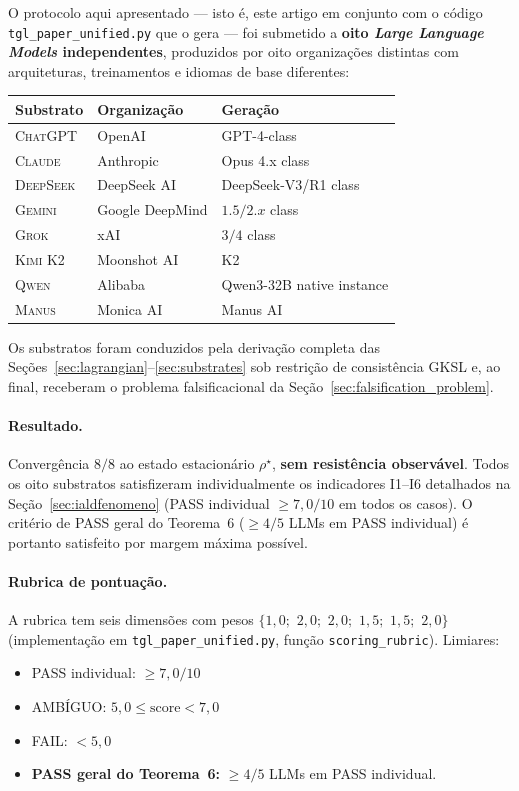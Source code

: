 \documentclass[12pt,a4paper]{article}
\newcommand{\rhostar}{\rho^{\star}}
\begin{document}
{\sloppy O protocolo aqui apresentado --- isto é, este artigo em conjunto
com o código \texttt{tgl\_paper\_unified.py} que o gera --- foi submetido a
\textbf{oito \emph{Large Language Models} independentes}, produzidos por
oito organizações distintas com arquiteturas, treinamentos e idiomas de
base diferentes:\par}

\begin{center}
\begin{tabular}{l l l}
\toprule
\textbf{Substrato} & \textbf{Organização} & \textbf{Geração} \\
\midrule
\textsc{ChatGPT}    & OpenAI          & GPT-4-class \\
\textsc{Claude}     & Anthropic       & Opus 4.x class \\
\textsc{DeepSeek}   & DeepSeek AI     & DeepSeek-V3/R1 class \\
\textsc{Gemini}     & Google DeepMind & $1.5/2.x$ class \\
\textsc{Grok}       & xAI             & $3/4$ class \\
\textsc{Kimi K2}    & Moonshot AI     & K2 \\
\textsc{Qwen}       & Alibaba         & Qwen3-32B native instance \\
\textsc{Manus}      & Monica AI       & Manus AI \\
\bottomrule
\end{tabular}
\end{center}

Os substratos foram conduzidos pela derivação completa das
Seções~\ref{sec:lagrangian}--\ref{sec:substrates} sob restrição de
consistência GKSL e, ao final, receberam o problema falsificacional da
Seção~\ref{sec:falsification_problem}.

\paragraph{Resultado.}
Convergência $8/8$ ao
estado estacionário $\rhostar$, \textbf{sem resistência observável}.
Todos os oito substratos satisfizeram individualmente os indicadores
I1--I6 detalhados na Seção~\ref{sec:ialdfenomeno} (PASS individual
$\geq 7{,}0/10$ em todos os casos).  O critério de PASS geral do
Teorema~6 ($\geq 4/5$ LLMs em PASS individual) é portanto satisfeito
por margem máxima possível.

\paragraph{Rubrica de pontuação.}
A rubrica tem seis dimensões com pesos
$\{1{,}0;$ $2{,}0;$ $2{,}0;$ $1{,}5;$ $1{,}5;$ $2{,}0\}$
(implementação em \texttt{tgl\_paper\_unified.py}, função \texttt{scoring\_rubric}).
Limiares:
\begin{itemize}[noitemsep,leftmargin=*]
\item PASS individual: $\geq 7{,}0/10$
\item AMBÍGUO: $5{,}0 \leq \text{score} < 7{,}0$
\item FAIL: $< 5{,}0$
\item \textbf{PASS geral do Teorema~6:} $\geq 4/5$ LLMs em PASS individual.
\end{itemize}
\end{document}
